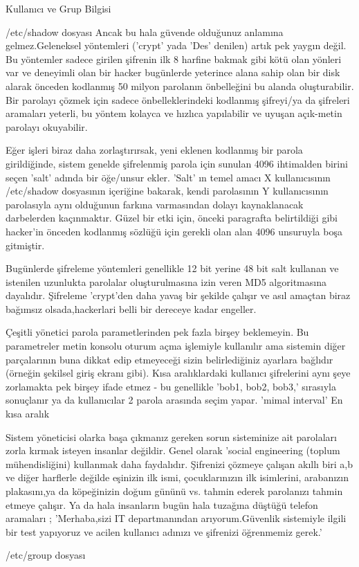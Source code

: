 \begin{section}{Kullanıcı ve Grup Bilgisi}
\begin{subsection}{/etc/shadow dosyası}
Ancak bu hala güvende olduğunuz anlamına gelmez.Geleneksel yöntemleri ('crypt' yada 'Des' denilen) artık pek yaygın değil. Bu yöntemler sadece girilen şifrenin ilk 8 harfine bakmak gibi kötü olan yönleri var ve deneyimli olan bir hacker bugünlerde yeterince alana sahip olan bir disk alarak önceden kodlanmış 50 milyon parolanın önbelleğini bu alanda oluşturabilir. Bir parolayı çözmek için sadece önbelleklerindeki kodlanmış şifreyi/ya da şifreleri aramaları yeterli, bu yöntem kolayca ve hızlıca yapılabilir ve uyuşan açık-metin parolayı okuyabilir.

Eğer işleri biraz daha zorlaştırırsak, yeni eklenen kodlanmış bir parola girildiğinde, sistem genelde şifrelenmiş parola için sunulan 4096 ihtimalden birini seçen 'salt' adında bir öğe/unsur ekler. 'Salt' ın temel amacı X kullanıcısının /etc/shadow dosyasının içeriğine bakarak, kendi parolasının Y kullanıcısının parolasıyla aynı olduğunun farkına varmasından dolayı kaynaklanacak darbelerden kaçınmaktır. Güzel bir etki için, önceki paragrafta belirtildiği gibi hacker'in önceden kodlanmış sözlüğü için gerekli olan alan 4096 unsuruyla boşa gitmiştir.

Bugünlerde şifreleme yöntemleri genellikle 12 bit yerine 48 bit salt kullanan ve istenilen uzunlukta parolalar oluşturulmasına izin veren MD5 algoritmasına dayalıdır. Şifreleme 'crypt'den daha yavaş bir şekilde çalışır ve asıl amaçtan biraz bağımsız olsada,hackerlari belli bir
dereceye kadar engeller.

Çeşitli yönetici parola parametlerinden pek fazla birşey beklemeyin. Bu parametreler metin konsolu oturum açma işlemiyle kullanılır ama sistemin diğer parçalarının buna dikkat edip etmeyeceği sizin belirlediğiniz ayarlara bağlıdır (örneğin şekilsel giriş ekranı gibi). Kısa aralıklardaki kullanıcı şifrelerini aynı şeye zorlamakta pek birşey ifade etmez - bu genellikle 'bob1, bob2, bob3,' sırasıyla sonuçlanır ya da kullanıcılar 2 parola arasında seçim yapar. 'mimal interval' En kısa aralık


Sistem yöneticisi olarka başa çıkmanız gereken sorun sisteminize ait parolaları zorla kırmak isteyen insanlar değildir. Genel olarak 'social engineering (toplum mühendisliğini) kullanmak daha faydalıdır. Şifrenizi çözmeye çalışan akıllı biri a,b ve diğer harflerle değilde eşinizin ilk ismi, çocuklarınızın ilk isimlerini, arabanızın plakasını,ya da köpeğinizin doğum gününü vs. tahmin ederek parolanızı tahmin etmeye çalışır. Ya da hala insanların bugün hala tuzağına düştüğü telefon aramaları ; 'Merhaba,sizi IT departmanından arıyorum.Güvenlik sistemiyle ilgili
bir test yapıyoruz ve acilen kullanıcı adınızı ve şifrenizi öğrenmemiz gerek.'
\end{subsection}
\begin{subsection}{/etc/group dosyası}


\end{subsection}
\end{section}
